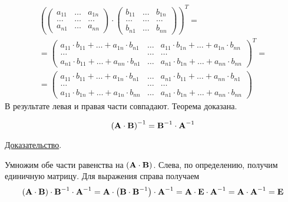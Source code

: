 \begin{theorem}
\begin{gather*}
        \left(
        \begin{pmatrix}
            a_{11} & \dots & a_{1n} \\
            \dots  & \dots & \dots  \\
            a_{n1} & \dots & a_{nn}
        \end{pmatrix}
        \cdot
        \begin{pmatrix}
            b_{11} & \dots & b_{1n} \\
            \dots  & \dots & \dots  \\
            b_{n1} & \dots & b_{nn}
        \end{pmatrix}
        \right)^T
        = \\
        = \begin{pmatrix}
              a_{11} \cdot b_{11} + \dots + a_{1n} \cdot b_{n1} & \dots & a_{11} \cdot b_{1n} + \dots + a_{1n} \cdot b_{nn} \\
              \dots                                             & \dots & \dots                                             \\
              a_{n1} \cdot b_{11} + \dots + a_{nn} \cdot b_{n1} & \dots & a_{n1} \cdot b_{1n} + \dots + a_{nn} \cdot b_{nn}
        \end{pmatrix}^T = \\
        = \begin{pmatrix}
              a_{11} \cdot b_{11} + \dots + a_{1n} \cdot b_{n1} & \dots & a_{n1} \cdot b_{11} + \dots + a_{nn} \cdot b_{n1} \\
              \dots                                             & \dots & \dots                                             \\
              a_{11} \cdot b_{1n} + \dots + a_{1n} \cdot b_{nn} & \dots & a_{n1} \cdot b_{1n} + \dots + a_{nn} \cdot b_{nn}
        \end{pmatrix}
    \end{gather*}
    В результате левая и правая части совпадают. Теорема доказана.
\end{theorem}

\begin{theorem}
    \begin{equation*}
        \left( \bf{A} \cdot \bf{B} \right)^{-1} = \bf{B}^{-1} \cdot \bf{A}^{-1}
    \end{equation*}

    \underline{Доказательство}.
    \vspace{5pt}

    Умножим обе части равенства на $\left( \bf{A} \cdot \bf{B} \right)$. Слева, по определению,
    получим единичную матрицу. Для выражения справа получаем
    \begin{equation*}
        \left( \bf{A} \cdot \bf{B} \right) \cdot \bf{B}^{-1} \cdot \bf{A}^{-1} = \bf{A} \cdot \left( \bf{B} \cdot \bf{B}^{-1} \right) \cdot \bf{A}^{-1} =
        \bf{A} \cdot \bf{E} \cdot \bf{A}^{-1} = \bf{A} \cdot \bf{A}^{-1} = \bf{E}
    \end{equation*}
\end{theorem}

